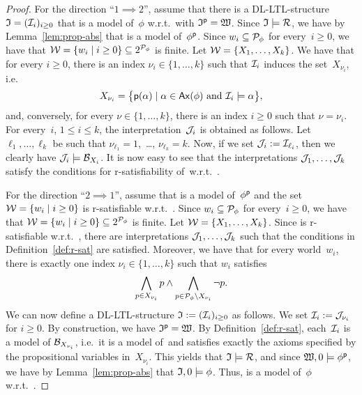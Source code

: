 \begin{proof}
    For the direction \enquote{$1\implies 2$}, assume that there is a
    DL-LTL-structure $\mathfrak{I}=(\mathcal{I}_i)_{i\ge 0}$ that is a model of~$\phi$
    w.r.t.~\Rmc with $\mathfrak{I}^\mathsf{p}=\mathfrak{W}$.
    Since $\mathfrak{I}\models\mathcal{R}$, we have by Lemma~\ref{lem:prop-abs} that \Wmf is a
    model of~$\phi^\mathsf{p}$.
    Since $w_i\subseteq\mathcal{P}_\phi$ for every~$i\ge 0$, we have that
    $\mathcal{W}=\{w_i\mid i\ge 0\}\subseteq 2^{\mathcal{P}_\phi}$ is finite.  Let
    $\mathcal{W}=\{X_1,\dots,X_k\}$.
    We have that for every $i\ge 0$, there is an index $\nu_i\in\{1,\dots,k\}$
    such that $\mathcal{I}_i$ induces the set~$X_{\nu_i}$, i.e.\
    \[X_{\nu_i}=\bigl\{\psf(\alpha)\mid\alpha\in\Ax(\phi)\ \text{and}\
        \Imc_i\models\alpha\bigr\},\]
    and, conversely, for every $\nu\in\{1,\dots,k\}$, there is an index $i\ge 0$
    such that $\nu=\nu_i$.
    For every~$i$, $1\le i\le k$, the interpretation~$\mathcal{J}_i$ is obtained as
    follows.  Let $\ell_1,\dots,\ell_k$ be such that $\nu_{\ell_1}=1$,~\dots,
    $\nu_{\ell_k}=k$.  Now, if we set $\mathcal{J}_i:=\mathcal{I}_{\ell_i}$, then we clearly
    have $\mathcal{J}_i\models\mathcal{B}_{X_i}$.  It is now easy to see that the
    interpretations $\mathcal{J}_1,\dots,\mathcal{J}_k$ satisfy the conditions for
    r-satisfiability of~\Wmc w.r.t.~\Rmc.

    For the direction \enquote{$2\implies 1$}, assume that \Wmf is a model
    of~$\phi^\mathsf{p}$ and the set $\mathcal{W}=\{w_i\mid i\ge 0\}$ is r-satisfiable
    w.r.t.~\Rmc.
    Since $w_i\subseteq\mathcal{P}_\phi$ for every~$i\ge 0$, we have that
    $\mathcal{W}=\{w_i\mid i\ge 0\}\subseteq 2^{\mathcal{P}_\phi}$ is finite.  Let
    $\mathcal{W}=\{X_1,\dots,X_k\}$.
    Since \Wmc is r-satisfiable w.r.t.~\Rmc, there are interpretations
    $\mathcal{J}_1,\dots,\mathcal{J}_k$ such that the conditions in Definition~\ref{def:r-sat}
    are satisfied.
    Moreover, we have that for every world~$w_i$, there is exactly one index
    $\nu_i\in\{1,\dots,k\}$ such that $w_i$ satisfies
    \[\bigwedge_{p\in X_{\nu_i}}p\land\bigwedge_{p\in\mathcal{P}_\phi\setminus X_{\nu_i}}\lnot p.\]
    We can now define a DL-LTL-structure $\mathfrak{I}:=(\mathcal{I}_i)_{i\ge 0}$ as follows.
    We set $\mathcal{I}_i:=\mathcal{J}_{\nu_i}$ for $i\ge 0$.  By construction, we have
    $\mathfrak{I}^\mathsf{p}=\mathfrak{W}$.  By Definition~\ref{def:r-sat},
    each~$\mathcal{I}_i$ is a model of $\mathcal{B}_{X_{\nu_i}}$, i.e.~it is a model of~\Rmc and
    satisfies exactly the axioms specified by the propositional variables
    in~$X_{\nu_i}$.  This yields that $\mathfrak{I}\models\mathcal{R}$, and since
    $\mathfrak{W},0\models\phi^\mathsf{p}$, we have by Lemma~\ref{lem:prop-abs} that
    $\mathfrak{I},0\models\phi$.  Thus, \Imf is a model of~$\phi$ w.r.t.~\Rmc.
\end{proof}

